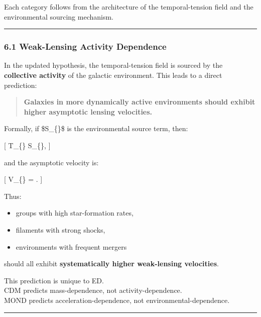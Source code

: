 Each category follows from the architecture of the temporal-tension
field and the environmental sourcing mechanism.

\begin{center}\rule{0.5\linewidth}{0.5pt}\end{center}

\subsubsection{6.1 Weak-Lensing Activity
Dependence}\label{weak-lensing-activity-dependence}

In the updated hypothesis, the temporal-tension field is sourced by the
\textbf{collective activity} of the galactic environment. This leads to
a direct prediction:

\begin{quote}
\textbf{Galaxies in more dynamically active environments should exhibit
higher asymptotic lensing velocities.}
\end{quote}

Formally, if \$S\_\{\}\$ is the environmental source term,
then:

{[} T\_\{\} \propto S\_\{\},  {]}

and the asymptotic velocity is:

{[} V\_\{\infty\} = .  {]}

Thus:

\begin{itemize}
\tightlist
\item
  groups with high star-formation rates,\\
\item
  filaments with strong shocks,\\
\item
  environments with frequent mergers
\end{itemize}

should all exhibit \textbf{systematically higher weak-lensing
velocities}.

This prediction is unique to ED.\\
CDM predicts mass-dependence, not activity-dependence.\\
MOND predicts acceleration-dependence, not environmental-dependence.

\begin{center}\rule{0.5\linewidth}{0.5pt}\end{center}

